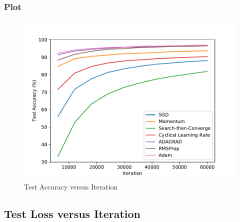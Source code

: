 \documentclass{article}
\begin{document}
\subsubsection{Plot}
\begin{figure}[H]
	\includegraphics[width=\textwidth, keepaspectratio]{TestAcc.pdf}
	\caption{Test Accuracy versus Iteration}
\end{figure}
\subsection{Test Loss versus Iteration}
\end{document}
